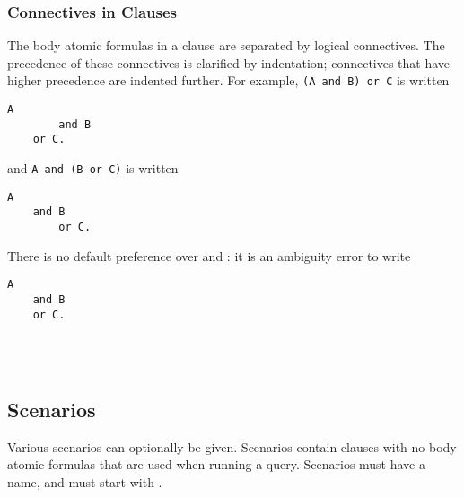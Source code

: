 \documentclass[../main.tex]{subfiles}
\begin{document}
\subsubsection{Connectives in Clauses}
The body atomic formulas in a clause are separated by logical connectives. The precedence of these connectives is clarified by indentation; connectives that have higher precedence are indented further. For example, \texttt{(A and B) or C} is written
\newpage
\begin{lstlisting}[language={LE}]
    A
        and B
    or C.
\end{lstlisting}
and \texttt{A and (B or C)} is written
\begin{lstlisting}[language={LE}]
    A
    and B
        or C.
\end{lstlisting}
There is no default preference over  and : it is an ambiguity error to write
\begin{lstlisting}[language={LE}]
    A 
    and B
    or C.
\end{lstlisting}
\\
\\

\subsection{Scenarios}
Various scenarios can optionally be given. Scenarios contain clauses with no body atomic formulas that are used when running a query. Scenarios must have a name, and must start with 
. 
\end{document}
